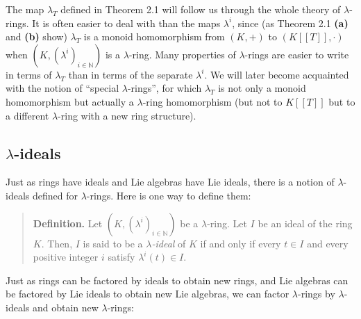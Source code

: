 \documentclass[numbers=enddot,12pt,final,onecolumn,notitlepage]{scrartcl}%
\begin{document}
The map $\lambda_{T}$ defined in Theorem 2.1 will follow us through the whole
theory of $\lambda$-rings. It is often easier to deal with than the maps
$\lambda^{i}$, since (as Theorem 2.1 \textbf{(a)} and \textbf{(b)} show)
$\lambda_{T}$ is a monoid homomorphism from $\left(  K,+\right)  $ to $\left(
K\left[  \left[  T\right]  \right]  ,\cdot\right)  $ when $\left(  K,\left(
\lambda^{i}\right)  _{i\in\mathbb{N}}\right)  $ is a $\lambda$-ring. Many
properties of $\lambda$-rings are easier to write in terms of $\lambda_{T}$
than in terms of the separate $\lambda^{i}$. We will later become acquainted
with the notion of ``special $\lambda$-rings'', for which $\lambda_{T}$ is not
only a monoid homomorphism but actually a $\lambda$-ring homomorphism (but not
to $K\left[  \left[  T\right]  \right]  $ but to a different $\lambda$-ring
with a new ring structure).

\subsection{$\lambda$-ideals}

Just as rings have ideals and Lie algebras have Lie ideals, there is a notion
of $\lambda$-ideals defined for $\lambda$-rings. Here is one way to define them:

\begin{quote}
\textbf{Definition.} Let $\left(  K,\left(  \lambda^{i}\right)  _{i\in
\mathbb{N}}\right)  $ be a $\lambda$-ring. Let $I$ be an ideal of the ring
$K$. Then, $I$ is said to be a $\lambda$\textit{-ideal} of $K$ if and only if
every $t\in I$ and every positive integer $i$ satisfy $\lambda^{i}\left(
t\right)  \in I$.
\end{quote}

Just as rings can be factored by ideals to obtain new rings, and Lie algebras
can be factored by Lie ideals to obtain new Lie algebras, we can factor
$\lambda$-rings by $\lambda$-ideals and obtain new $\lambda$-rings:
\end{document}
